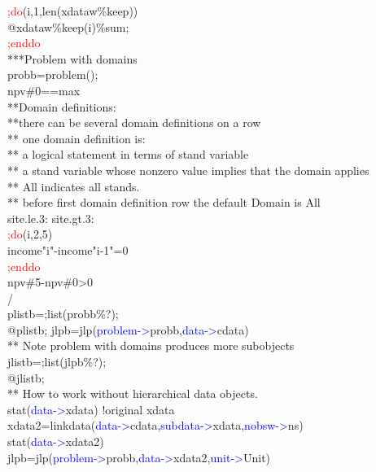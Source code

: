 \begin{example}[jlpex]
\textcolor{Red}{;do}(i,1,\textcolor{VioletRed}{len}(xdataw\%keep))\\
@xdataw\%keep(i)\%sum;\\
\textcolor{Red}{;enddo}\\
***Problem with domains\\
probb=\textcolor{VioletRed}{problem}();\\
npv\#0==max\\
**Domain definitions:\\
**there can be several domain definitions on a row\\
** one domain definition is:\\
**    a logical statement in terms of stand variable\\
**    a stand variable whose nonzero value implies that the domain applies\\
**    All  indicates all stands.\\
** before first domain definition row the default Domain is All\\
site.le.3: site.gt.3:\\
\textcolor{Red}{;do}(i,2,5)\\
income"i"-income"i-1"=0\\
\textcolor{Red}{;enddo}\\
npv\#5-npv\#0>0\\
/\\
plistb=;list(probb\%?);\\
@plistb;
jlpb=\textcolor{VioletRed}{jlp}(\textcolor{blue}{problem->}probb,\textcolor{blue}{data->}cdata)\\
** Note problem with domains produces more subobjects\\
jlistb=;list(jlpb\%?);\\
@jlistb;\\
**  How to work without hierarchical data objects.\\
\textcolor{VioletRed}{stat}(\textcolor{blue}{data->}xdata)  !original xdata\\
xdata2=\textcolor{VioletRed}{linkdata}(\textcolor{blue}{data->}cdata,\textcolor{blue}{subdata->}xdata,\textcolor{blue}{nobsw->}ns)\\
\textcolor{VioletRed}{stat}(\textcolor{blue}{data->}xdata2)\\
jlpb=\textcolor{VioletRed}{jlp}(\textcolor{blue}{problem->}probb,\textcolor{blue}{data->}xdata2,\textcolor{blue}{unit->}Unit)
\end{example}
